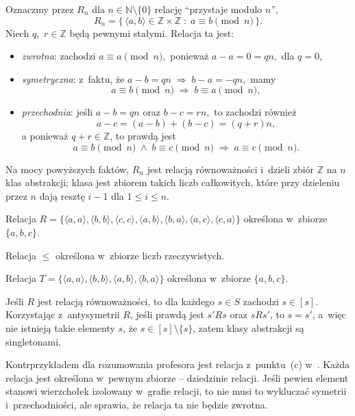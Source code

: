 \exercise %
Oznaczmy przez $R_n$ dla $n\in\mathbb{N}\setminus\{0\}$ relację ``przystaje modulo $n$'',
\[
	R_n = \bigl\{\,\langle a,b\rangle\in\mathbb{Z}\times\mathbb{Z}\;:\;a\equiv b\!\!\!\pmod{n}\,\bigr\}.
\]
Niech $q$,~$r\in\mathbb{Z}$ będą pewnymi stałymi. Relacja ta jest:
\begin{itemize}
	\item \emph{zwrotna}: zachodzi $a\equiv a\pmod{n},$ ponieważ $a-a=0=qn,$ dla $q=0$,
	\item \emph{symetryczna}: z~faktu, że $a-b=qn\;\Rightarrow\;b-a=-qn,$ mamy
	\[
		a\equiv b\!\!\!\pmod{n}\;\Rightarrow\;b\equiv a\!\!\!\pmod{n},
	\]
	\item \emph{przechodnia}: jeśli $a-b=qn$ oraz $b-c=rn,$ to zachodzi również
	\[
		a-c=(a-b)+(b-c)=(q+r)n,
	\]
	a ponieważ $q+r\in\mathbb{Z}$, to prawdą jest
	\[
		a\equiv b\!\!\!\pmod{n}\;\wedge\;b\equiv c\!\!\!\pmod{n}\;\Rightarrow\;a\equiv c\!\!\!\pmod{n}.
	\]
\end{itemize}

Na mocy powyższych faktów, $R_n$ jest relacją równoważności i~dzieli zbiór $\mathbb{Z}$ na $n$ klas abstrakcji;  klasa jest zbiorem takich liczb całkowitych, które przy dzieleniu przez $n$ dają resztę $i-1$ dla $1\le i\le n$.

\exercise %
\subexercise
Relacja $R=\bigl\{\langle a,a\rangle,\langle b,b\rangle,\langle c,c\rangle,\langle a,b\rangle,\langle b,a\rangle,\langle a,c\rangle,\langle c,a\rangle\bigr\}$ określona w~zbiorze $\{a,b,c\}$.

\subexercise
Relacja $\le$ określona w~zbiorze liczb rzeczywistych.

\subexercise
Relacja $T=\bigl\{\langle a,a\rangle,\langle b,b\rangle,\langle a,b\rangle,\langle b,a\rangle\bigr\}$ określona w~zbiorze $\{a,b,c\}$.

\exercise %
Jeśli $R$ jest relacją równoważności, to dla każdego $s\in S$ zachodzi $s\in[s]$. Korzystając z~antysymetrii $R$, jeśli prawdą jest $s'\!Rs$ oraz $sRs'$, to $s=s'$, a~więc nie istnieją takie elementy $s$, że $s\in[s]\setminus\{s\}$, zatem klasy abstrakcji są singletonami.

\exercise %
Kontrprzykładem dla rozumowania profesora jest relacja z~punktu~(c) w~. Każda relacja jest określona w~pewnym zbiorze -- dziedzinie relacji. Jeśli pewien element stanowi wierzchołek izolowany w~grafie relacji, to nie musi to wykluczać symetrii i~przechodniości, ale sprawia, że relacja ta nie będzie zwrotna.

